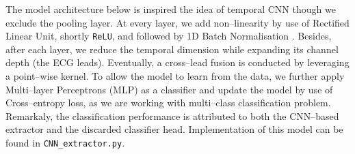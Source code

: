 The model architecture below is inspired the idea of temporal CNN \cite{lea2016temporal} though we exclude the pooling layer.
At every layer, we add non–linearity by use of Rectified Linear Unit, shortly \texttt{ReLU}, and followed by 1D Batch Normalisation \cite{pmlr-v37-ioffe15}.
Besides, after each layer, we reduce the temporal dimension while expanding its channel depth (the ECG leads).
Eventually, a cross–lead fusion is conducted by leveraging a point–wise kernel. To allow the model to learn from the data, we further apply Multi–layer Perceptrons (MLP) as a classifier and update the model by use of Cross–entropy loss, as we are working with multi–class classification problem.
Remarkaly, the classification performance is attributed to both the CNN–based extractor and the discarded classifier head.
Implementation of this model can be found in \texttt{CNN\_extractor.py}.

